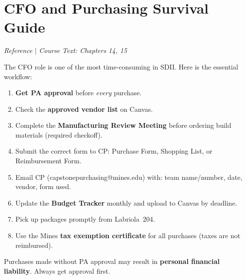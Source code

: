 \section{CFO and Purchasing Survival Guide}
\textit{Reference $|$ Course Text: Chapters 14, 15}

The CFO role is one of the most time-consuming in SDII. Here is the essential workflow:

\begin{enumerate}[nosep,leftmargin=1.5em]
\item \textbf{Get PA approval} before \emph{every} purchase.
\item Check the \textbf{approved vendor list} on Canvas.
\item Complete the \textbf{Manufacturing Review Meeting} before ordering build materials (required checkoff).
\item Submit the correct form to CP: Purchase Form, Shopping List, or Reimbursement Form.
\item Email CP (capstonepurchasing@mines.edu) with: team name/number, date, vendor, form used.
\item Update the \textbf{Budget Tracker} monthly and upload to Canvas by deadline.
\item Pick up packages promptly from Labriola~204.
\item Use the Mines \textbf{tax exemption certificate} for all purchases (taxes are not reimbursed).
\end{enumerate}

\begin{warnbox}
Purchases made without PA approval may result in \textbf{personal financial liability}. Always get approval first.
\end{warnbox}


